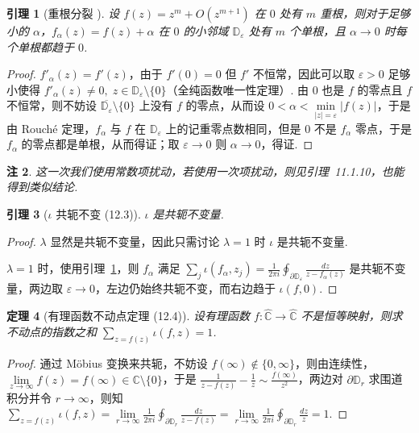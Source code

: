 \documentclass[11pt, a4paper, oneside]{ctexart}
\newtheorem{theorem}{定理}[section]
\newtheorem{lemma}[theorem]{引理}
\newtheorem{remark}[theorem]{注}
\newcommand{\C}{\mathbb{C}}
\newcommand{\D}{\mathbb{D}}
\newcommand{\abs}[1]{\left|{#1}\right|}
\begin{document}
    \begin{lemma}[重根分裂 \uppercase\expandafter{}]\label{重根2}
        设 $f(z)=z^m+O(z^{m+1})$ 在 $0$ 处有 $m$ 重根，则对于足够小的 $\alpha$，$f_{\alpha}(z)=f(z)+\alpha$ 在 $0$ 的小邻域 $\D_{\varepsilon}$ 处有 $m$ 个单根，且 $\alpha\to 0$ 时每个单根都趋于 $0$.
    \end{lemma}
    \begin{proof}
        $f'_{\alpha}(z)=f'(z)$，由于 $f'(0)=0$ 但 $f'$ 不恒常，因此可以取 $\varepsilon>0$ 足够小使得 $f'_{\alpha}(z)\neq 0,\; z\in \D_{\varepsilon}\setminus\{0\}$（全纯函数唯一性定理）. 由 $0$ 也是 $f$ 的零点且 $f$ 不恒常，则不妨设 $\overline{\D_{\varepsilon}}\setminus\{0\}$ 上没有 $f$ 的零点，从而设 $0<\alpha<\min\limits_{\abs{z}=\varepsilon}\abs{f(z)}$，于是由 Rouché 定理，$f_{\alpha}$ 与 $f$ 在 $\D_{\varepsilon}$ 上的记重零点数相同，但是 $0$ 不是 $f_{\alpha}$ 零点，于是 $f_{\alpha}$ 的零点都是单根，从而得证；取 $\varepsilon\to 0$ 则 $\alpha\to 0$，得证.
    \end{proof}
    \begin{remark}
        这一次我们使用常数项扰动，若使用一次项扰动，则见引理~11.1.10，也能得到类似结论.
    \end{remark}

    \begin{lemma}[$\iota$ 共轭不变 (12.3)]\label{引理12.3}
        $\iota$ 是共轭不变量.
    \end{lemma}
    \begin{proof}
        $\lambda$ 显然是共轭不变量，因此只需讨论 $\lambda=1$ 时 $\iota$ 是共轭不变量.

        $\lambda=1$ 时，使用引理~\ref{重根2}，则 $f_{\alpha}$ 满足 $\sum\limits_{j}\iota(f_{\alpha},z_j)=\frac{1}{2\pi i}\oint_{\partial\D_{\varepsilon}}\frac{dz}{z-f_{\alpha}(z)}$ 是共轭不变量，两边取 $\varepsilon\to 0$，左边仍始终共轭不变，而右边趋于 $\iota(f,0)$.
    \end{proof}

    \begin{theorem}[有理函数不动点定理 (12.4)]\label{定理12.4}
        设有理函数 $f:\hat{\C}\to \hat{\C}$ 不是恒等映射，则求不动点的指数之和 $\sum\limits_{z=f(z)}\iota(f,z)=1$.
    \end{theorem}
    \begin{proof}
        通过 Möbius 变换来共轭，不妨设 $f(\infty)\notin \{0,\infty\}$，则由连续性，$\lim\limits_{z\to\infty}f(z)=f(\infty)\in \C\setminus\{0\}$，于是 $\frac{1}{z-f(z)}-\frac{1}{z}\sim \frac{f(\infty)}{z^2}$，两边对 $\partial \D_r$ 求围道积分并令 $r\to\infty$，则知 $\sum\limits_{z=f(z)}\iota(f,z)=\lim\limits_{r\to\infty}\frac{1}{2\pi i}\oint_{\partial \D_r}\frac{dz}{z-f(z)}=\lim\limits_{r\to\infty}\frac{1}{2\pi i}\oint_{\partial \D_r}\frac{dz}{z}=1$.
    \end{proof}
\end{document}

